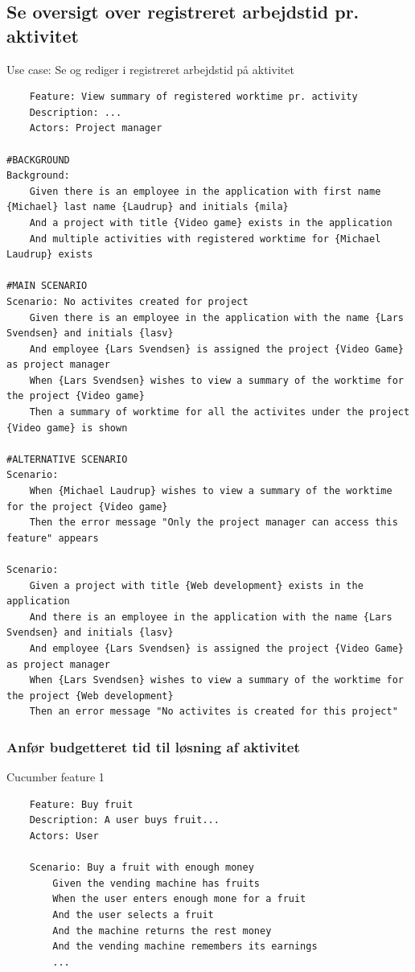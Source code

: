 \subsection{Se oversigt over registreret arbejdstid pr. aktivitet}
\begin{listing}[H]
    \centering
    \caption{Use case: Se og rediger i registreret arbejdstid på aktivitet}\label{lst:usecase_oversigt_over_registreret_arbejdstid_pr_aktivitet}
    \begin{verbatim}  
    Feature: View summary of registered worktime pr. activity
    Description: ...
    Actors: Project manager

#BACKGROUND
Background: 
    Given there is an employee in the application with first name {Michael} last name {Laudrup} and initials {mila}
    And a project with title {Video game} exists in the application
    And multiple activities with registered worktime for {Michael Laudrup} exists

#MAIN SCENARIO
Scenario: No activites created for project
    Given there is an employee in the application with the name {Lars Svendsen} and initials {lasv}
    And employee {Lars Svendsen} is assigned the project {Video Game} as project manager
    When {Lars Svendsen} wishes to view a summary of the worktime for the project {Video game}
    Then a summary of worktime for all the activites under the project {Video game} is shown

#ALTERNATIVE SCENARIO
Scenario:  
    When {Michael Laudrup} wishes to view a summary of the worktime for the project {Video game}
    Then the error message "Only the project manager can access this feature" appears

Scenario: 
    Given a project with title {Web development} exists in the application
    And there is an employee in the application with the name {Lars Svendsen} and initials {lasv}
    And employee {Lars Svendsen} is assigned the project {Video Game} as project manager
    When {Lars Svendsen} wishes to view a summary of the worktime for the project {Web development}
    Then an error message "No activites is created for this project"

    \end{verbatim}
\end{listing}

\subsubsection{Anfør budgetteret tid til løsning af aktivitet}
\begin{listing}[H]
    \centering
    \caption{Cucumber feature 1}\label{lst:feature1}
    \begin{verbatim}
    Feature: Buy fruit
    Description: A user buys fruit...
    Actors: User
        
    Scenario: Buy a fruit with enough money
        Given the vending machine has fruits
        When the user enters enough mone for a fruit
        And the user selects a fruit
        And the machine returns the rest money
        And the vending machine remembers its earnings
        ...
    \end{verbatim}
\end{listing}
\FloatBarrier

